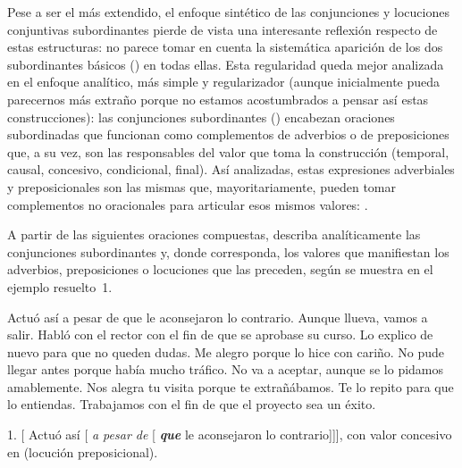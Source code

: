 Pese a ser el más extendido, el enfoque sintético de las conjunciones y
locuciones conjuntivas subordinantes pierde de vista una interesante reflexión
respecto de estas estructuras: no parece tomar en cuenta la sistemática aparición
de los dos subordinantes básicos () en todas ellas. Esta
regularidad queda mejor analizada en el enfoque analítico, más simple y
regularizador (aunque inicialmente pueda parecernos más extraño porque no estamos
acostumbrados a pensar así estas construcciones): las conjunciones subordinantes
() encabezan oraciones subordinadas que funcionan como
complementos de adverbios o de preposiciones que, a su vez, son las responsables
del valor que toma la construcción (temporal, causal, concesivo, condicional,
final). Así analizadas, estas expresiones adverbiales y preposicionales son las
mismas que, mayoritariamente, pueden tomar complementos no oracionales para
articular esos mismos valores: .

\begin{ejercicio}\label{ej:13-analitica}
A partir de las siguientes oraciones compuestas, describa analíticamente las
conjunciones subordinantes y, donde corresponda, los valores que manifiestan los
adverbios, preposiciones o locuciones que las preceden, según se muestra en el
ejemplo resuelto~1.

\begin{exe}
  \ex Actuó así a pesar de que le aconsejaron lo contrario.
  \ex Aunque llueva, vamos a salir.
  \ex Habló con el rector con el fin de que se aprobase su curso.
  \ex Lo explico de nuevo para que no queden dudas.
  \ex Me alegro porque lo hice con cariño.
  \ex No pude llegar antes porque había mucho tráfico.
  \ex No va a aceptar, aunque se lo pidamos amablemente.
  \ex Nos alegra tu visita porque te extrañábamos.
  \ex Te lo repito para que lo entiendas.
  \ex Trabajamos con el fin de que el proyecto sea un éxito.
\end{exe}

\begin{resuelto}
1. [ Actuó así [ \textit{a pesar de} [
\textbf{\textit{que}} le aconsejaron lo contrario]]], con valor concesivo en
 (locución preposicional).
\end{resuelto}
\end{ejercicio}

